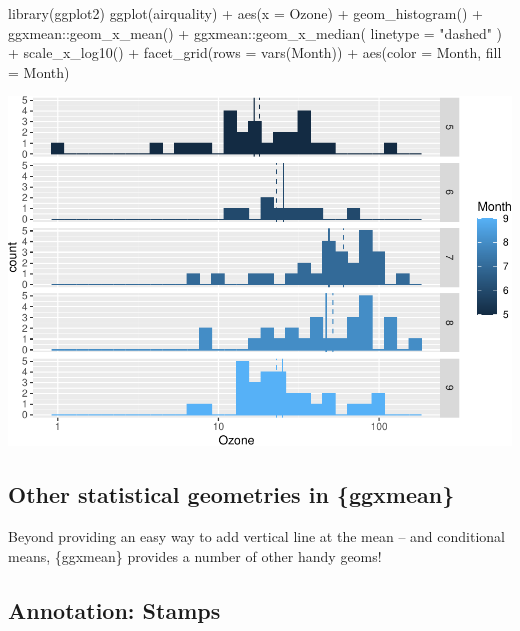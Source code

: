 \documentclass[12pt]{article}
\newenvironment{Shaded}{\begin{snugshade}}{\end{snugshade}}
\newcommand{\AttributeTok}[1]{\textcolor[rgb]{0.77,0.63,0.00}{#1}}
\newcommand{\FunctionTok}[1]{\textcolor[rgb]{0.00,0.00,0.00}{#1}}
\newcommand{\NormalTok}[1]{#1}
\newcommand{\SpecialCharTok}[1]{\textcolor[rgb]{0.00,0.00,0.00}{#1}}
\newcommand{\StringTok}[1]{\textcolor[rgb]{0.31,0.60,0.02}{#1}}
\begin{document}
\begin{Shaded}
\begin{Highlighting}[]
\FunctionTok{library}\NormalTok{(ggplot2)}
\FunctionTok{ggplot}\NormalTok{(airquality) }\SpecialCharTok{+} 
  \FunctionTok{aes}\NormalTok{(}\AttributeTok{x =}\NormalTok{ Ozone) }\SpecialCharTok{+} 
  \FunctionTok{geom\_histogram}\NormalTok{() }\SpecialCharTok{+} 
\NormalTok{  ggxmean}\SpecialCharTok{::}\FunctionTok{geom\_x\_mean}\NormalTok{() }\SpecialCharTok{+} 
\NormalTok{  ggxmean}\SpecialCharTok{::}\FunctionTok{geom\_x\_median}\NormalTok{(}
    \AttributeTok{linetype =} \StringTok{"dashed"}
\NormalTok{  ) }\SpecialCharTok{+}
  \FunctionTok{scale\_x\_log10}\NormalTok{() }\SpecialCharTok{+}
  \FunctionTok{facet\_grid}\NormalTok{(}\AttributeTok{rows =} \FunctionTok{vars}\NormalTok{(Month)) }\SpecialCharTok{+}
  \FunctionTok{aes}\NormalTok{(}\AttributeTok{color =}\NormalTok{ Month, }\AttributeTok{fill =}\NormalTok{ Month)}
\end{Highlighting}
\end{Shaded}

\begin{center}\includegraphics[width=0.5\linewidth]{skeleton_files/figure-latex/unnamed-chunk-5-1} \end{center}

\hypertarget{other-statistical-geometries-in-ggxmean}{%
\subsection{Other statistical geometries in
\{ggxmean\}}\label{other-statistical-geometries-in-ggxmean}}

Beyond providing an easy way to add vertical line at the mean -- and
conditional means, \{ggxmean\} provides a number of other handy geoms!

\hypertarget{annotation-stamps}{%
\subsection{Annotation: Stamps}\label{annotation-stamps}}
\end{document}
